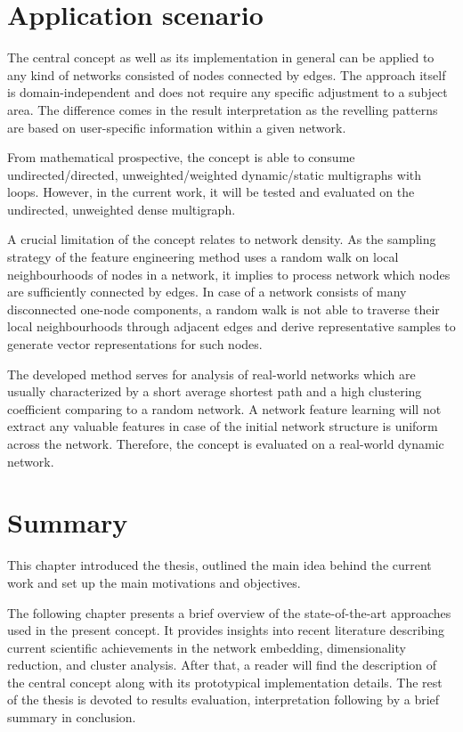 \section{Application scenario}
The central concept as well as its implementation in general  can be applied to any kind of networks consisted of nodes connected by edges. The approach itself is domain-independent and does not require any specific adjustment to a subject area. The difference comes in the result interpretation as the revelling patterns are based on user-specific information within a given network.

From mathematical prospective, the concept is able to consume undirected/directed, unweighted/weighted dynamic/static multigraphs with loops. However, in the current work, it will be tested and evaluated on the undirected, unweighted dense multigraph.

A crucial limitation of the concept relates to network density. As the sampling strategy of the feature engineering method uses a random walk on local neighbourhoods of nodes in a network, it implies to process network which nodes are sufficiently connected by edges. In case of a network consists of many disconnected one-node components, a random walk is not able to traverse their local neighbourhoods through adjacent edges and derive representative samples to generate vector representations for such nodes. 

The developed method serves for analysis of real-world networks which are usually characterized by a short average shortest path and a high clustering coefficient comparing to a random network. A network feature learning will not extract any valuable features in case of the initial network structure is uniform across the network. Therefore, the concept is evaluated on a real-world dynamic network.

\section{Summary}
This chapter introduced the thesis, outlined the main idea behind the current work and set up the main motivations and objectives.

The following chapter presents a brief overview of the state-of-the-art approaches used in the present concept. It provides insights into recent literature describing current scientific achievements in the network embedding, dimensionality reduction, and cluster analysis. After that, a reader will find the description of the central concept along with its prototypical implementation details. The rest of the thesis is devoted to results evaluation, interpretation following by a brief summary in conclusion.